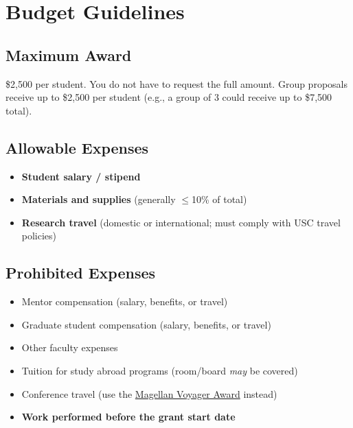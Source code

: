 \documentclass[11pt, letterpaper]{article}
\begin{document}
\section{Budget Guidelines}

\subsection{Maximum Award}

\$2,500 per student. You do not have to request the full amount. Group proposals receive up to \$2,500 per student (e.g., a group of 3 could receive up to \$7,500 total).

\subsection{Allowable Expenses}

\begin{itemize}[nosep]
    \item \textbf{Student salary / stipend}
    \item \textbf{Materials and supplies} (generally $\leq$10\% of total)
    \item \textbf{Research travel} (domestic or international; must comply with USC travel policies)
\end{itemize}

\subsection{Prohibited Expenses}

\begin{itemize}[nosep]
    \item Mentor compensation (salary, benefits, or travel)
    \item Graduate student compensation (salary, benefits, or travel)
    \item Other faculty expenses
    \item Tuition for study abroad programs (room/board \emph{may} be covered)
    \item Conference travel (use the \href{https://sc.edu/about/offices_and_divisions/undergraduate_research/funding_opportunities/our_funding/magellan-research-application/}{Magellan Voyager Award} instead)
    \item \textbf{Work performed before the grant start date}
\end{itemize}
\end{document}

